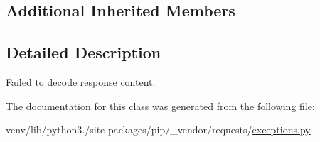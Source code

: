 \subsection*{Additional Inherited Members}


\subsection{Detailed Description}
\begin{DoxyVerb}Failed to decode response content.\end{DoxyVerb}
 

The documentation for this class was generated from the following file\+:\begin{DoxyCompactItemize}
\item 
venv/lib/python3./site-\/packages/pip/\+\_\+vendor/requests/\hyperlink{pip_2__vendor_2requests_2exceptions_8py}{exceptions.\+py}\end{DoxyCompactItemize}
